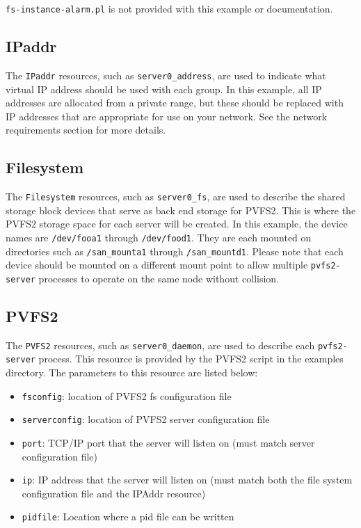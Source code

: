 \documentclass[11pt]{article}
\begin{document}
\texttt{fs-instance-alarm.pl} is not provided with this example or
documentation.

\subsection{IPaddr}

The \texttt{IPaddr} resources, such as \texttt{server0\_address}, are
used to indicate what virtual IP address should be used with each group.
In this example, all IP addresses are allocated from a private range, but
these should be replaced with IP addresses that are appropriate for use
on your network.  See the network requirements section for more details.

\subsection{Filesystem}

The \texttt{Filesystem} resources, such as \texttt{server0\_fs}, are used to
describe the shared storage block devices that serve as back end storage
for PVFS2.  This is where the PVFS2 storage space for each server will
be created.  In this example, the device names are \texttt{/dev/fooa1}
through \texttt{/dev/food1}.  They are each mounted on directories such
as \texttt{/san\_mounta1} through \texttt{/san\_mountd1}.  Please note
that each device should be mounted on a different mount point to allow
multiple \texttt{pvfs2-server} processes to operate on the same node without
collision.

\subsection{PVFS2}

The \texttt{PVFS2} resources, such as \texttt{server0\_daemon}, are used
to describe each \texttt{pvfs2-server} process.  This resource is provided by the
PVFS2 script in the examples directory.  The parameters to this resource
are listed below:
\begin{itemize}
\item \texttt{fsconfig}: location of PVFS2 fs configuration file
\item \texttt{serverconfig}: location of PVFS2 server configuration file
\item \texttt{port}: TCP/IP port that the server will listen on (must match server
configuration file)
\item \texttt{ip}: IP address that the server will listen on (must match both the file
system configuration file and the IPAddr resource)
\item \texttt{pidfile}: Location where a pid file can be written
\end{itemize}
\end{document}
